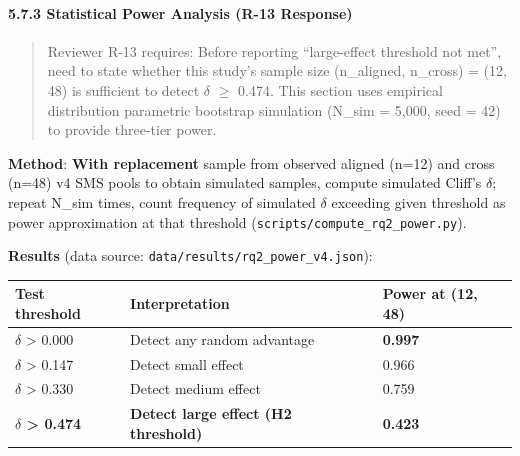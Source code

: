\documentclass[review,12pt,authoryear]{elsarticle}
\begin{document}
\paragraph{5.7.3 Statistical Power Analysis (R-13
Response)}\label{statistical-power-analysis-r-13-response}

\begin{quote}
Reviewer R-13 requires: Before reporting ``large-effect threshold not
met'', need to state whether this study's sample size (n\_aligned,
n\_cross) = (12, 48) is sufficient to detect $\delta$ $\geq$ 0.474. This section
uses empirical distribution parametric bootstrap simulation (N\_sim =
5,000, seed = 42) to provide three-tier power.
\end{quote}

\textbf{Method}: \textbf{With replacement} sample from observed aligned
(n=12) and cross (n=48) v4 SMS pools to obtain simulated samples,
compute simulated Cliff's $\delta$; repeat N\_sim times, count frequency of
simulated $\delta$ exceeding given threshold as power approximation at that
threshold (\texttt{scripts/compute\_rq2\_power.py}).

\textbf{Results} (data source:
\texttt{data/results/rq2\_power\_v4.json}):

{\def\LTcaptype{none} %
\begin{longtable}[]{@{}lll@{}}
\toprule\noalign{}
Test threshold & Interpretation & Power at (12, 48) \\
\midrule\noalign{}
\endhead
\bottomrule\noalign{}
\endlastfoot
$\delta$ \textgreater{} 0.000 & Detect any random advantage & \textbf{0.997} \\
$\delta$ \textgreater{} 0.147 & Detect small effect & 0.966 \\
$\delta$ \textgreater{} 0.330 & Detect medium effect & 0.759 \\
\textbf{$\delta$ \textgreater{} 0.474} & \textbf{Detect large effect (H2
threshold)} & \textbf{0.423} \\
\end{longtable}
}
\end{document}

